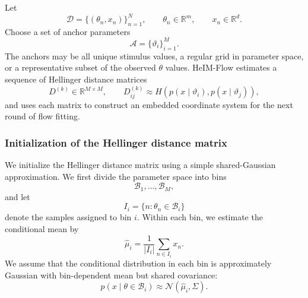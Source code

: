 Let
\begin{equation}
    \mathcal{D}=\{(\theta_n,x_n)\}_{n=1}^N,
    \qquad
    \theta_n\in\mathbb{R}^m,
    \qquad
    x_n\in\mathbb{R}^d.
\end{equation}
Choose a set of anchor parameters
\begin{equation}
    \mathcal{A}=\{\vartheta_i\}_{i=1}^M.
\end{equation}
The anchors may be all unique stimulus values, a regular grid in parameter space, or a representative subset of the observed $\theta$ values. HeIM-Flow estimates a sequence of Hellinger distance matrices
\begin{equation}
    D^{(k)}\in\mathbb{R}^{M\times M},
    \qquad
    D_{ij}^{(k)}\approx H\!\left(p(x\mid \vartheta_i),p(x\mid \vartheta_j)\right),
\end{equation}
and uses each matrix to construct an embedded coordinate system for the next round of flow fitting.

\subsubsection{Initialization of the Hellinger distance matrix}

We initialize the Hellinger distance matrix using a simple shared-Gaussian approximation.
We first divide the parameter space into bins
\[
    \mathcal B_1,\dots,\mathcal B_M,
\]
and let
\[
    I_i=\{n:\theta_n\in \mathcal B_i\}
\]
denote the samples assigned to bin $i$. Within each bin, we estimate the conditional mean by
\begin{equation}
    \widehat\mu_i
    =
    \frac{1}{|I_i|}
    \sum_{n\in I_i} x_n .
\end{equation}
We assume that the conditional distribution in each bin is approximately Gaussian with bin-dependent mean but shared covariance:
\begin{equation}
    p(x\mid \theta\in\mathcal B_i)
    \approx
    \mathcal N(\widehat\mu_i,\Sigma).
\end{equation}


